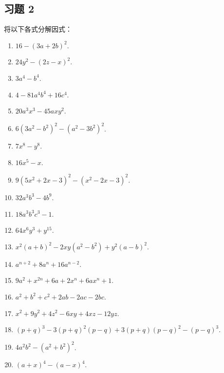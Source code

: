 \subsection*{习题 2}
将以下各式分解因式：
\begin{enumerate}
	\item $16- (3 a+2 b)^{2}$.
	\item $24 y^{2}-(2 z-x)^{2}$.
	\item $3 a^{4}-b^{4}$.
	\item $4-81 a^{4} b^{4}+16 c^{4}$.
	\item $20 a^{3} x^{3}-45 a x y^{2}$.
	\item $6\left(3 a^{2}-b^{2}\right)^{2}-\left(a^{2}-3 b^{2}\right)^{2}$.
	\item $7 x^{8}-y^{8}$.
	\item $16 x^{5}-x$.
	\item $9\left(5 x^{2}+2 x-3\right)^{2}-\left(x^{2}-2 x-3\right)^{2}$.
	\item $32 a^{3} b^{3}-4 b^{9}$.
	\item $18 a^{3} b^{3} c^{3}-1$.
	\item $64 x^{6} y^{3}+y^{15}$.
	\item $x^{2}(a+b)^{2}-2 x y\left(a^{2}-b^{2}\right)+y^{2}(a-b)^{2}$.
	\item $a^{n+2}+8 a^{n}+16 a^{n-2}$.
	\item $9 a^{2}+x^{2 n}+6 a+2 x^{n}+6 a x^{n}+1$.
	\item $a^{2}+b^{2}+c^{2}+2 a b-2 a c-2 b c$.
	\item $x^{2}+9 y^{2}+4 z^{2}-6 x y+4 x z-12 y z$.
	\item $(p+q)^{3}-3(p+q)^{2}(p-q)+3(p+q)(p-q)^{2}-(p-q)^{3}$.
	\item $4 a^{2} b^{2}-\left(a^{2}+b^{2}\right)^{2}$.
	\item $(a+x)^{4}-(a-x)^{4}$.
\end{enumerate}